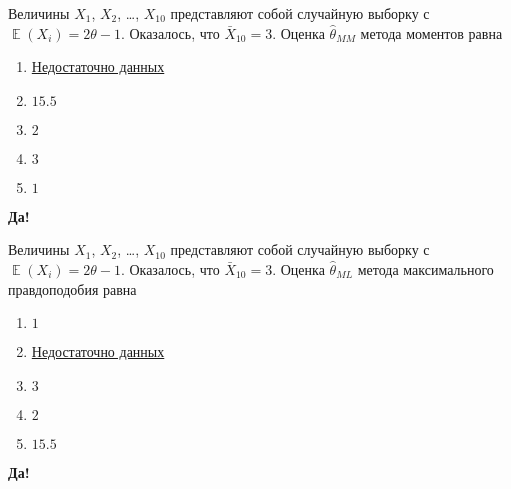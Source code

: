 \documentclass[t]{beamer}
\DeclareMathOperator{\E}{\mathbb{E}}
\begin{document}
 \begin{frame} \label{13-Yes} 
\begin{block}{13} 

  Величины $X_1$, $X_2$, \ldots, $X_{10}$ представляют собой случайную выборку с $\E(X_i) = 2\theta - 1$. Оказалось, что $\bar X_{10}=3$. Оценка $\hat\theta_{MM}$ метода моментов равна


 \end{block} 
\begin{enumerate} 
\item[] \hyperlink{13-No}{\beamergotobutton{} Недостаточно данных}
\item[] \hyperlink{13-No}{\beamergotobutton{} $15.5$}
\item[] \hyperlink{13-Yes}{\beamergotobutton{} $2$}
\item[] \hyperlink{13-No}{\beamergotobutton{} $3$}
\item[] \hyperlink{13-No}{\beamergotobutton{} $1$}
\end{enumerate} 

 \textbf{Да!} 
 \hyperlink{14}{}\end{frame} 


 \begin{frame} \label{14-Yes} 
\begin{block}{14} 

    Величины $X_1$, $X_2$, \ldots, $X_{10}$ представляют собой случайную выборку с $\E(X_i) = 2\theta - 1$. Оказалось, что $\bar X_{10}=3$. Оценка $\hat\theta_{ML}$ метода максимального правдоподобия равна
    

 \end{block} 
\begin{enumerate} 
\item[] \hyperlink{14-No}{\beamergotobutton{} $1$}
\item[] \hyperlink{14-Yes}{\beamergotobutton{} Недостаточно данных}
\item[] \hyperlink{14-No}{\beamergotobutton{} $3$}
\item[] \hyperlink{14-No}{\beamergotobutton{} $2$}
\item[] \hyperlink{14-No}{\beamergotobutton{} $15.5$}
\end{enumerate} 

 \textbf{Да!} 
 \hyperlink{15}{}\end{frame} 
\end{document}

